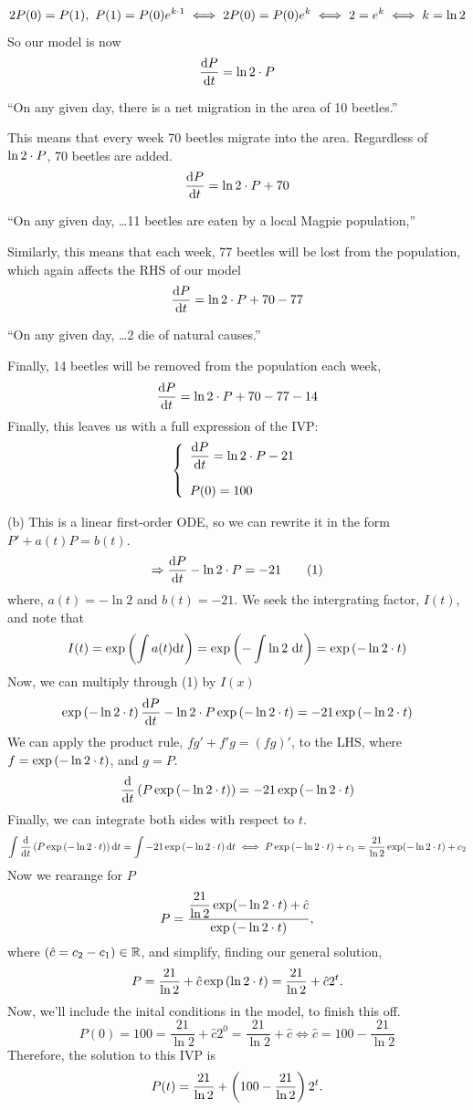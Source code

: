 \documentclass[a4paper, 11pt]{report}
\begin{document}
$$
	2P(0) = P(1),\ P(1) = P(0)e^{k\cd1} \iff 2P(0) = P(0)e^k \iff 2 = e^k \iff k=\ln2
$$
So our model is now
$$
	\dyd[P]{t} = \ln2\cd P
$$
\begin{center}
	``On any given day, there is a net migration in the area of 10 beetles.''
\end{center}
This means that every week 70 beetles migrate into the area. Regardless of $\ln2\cd P$, 70 beetles are added.
$$
	\dyd[P]{t} = \ln2\cd P + 70
$$
\begin{center}
	``On any given day, \dots11 beetles are eaten by a local Magpie population,''
\end{center}
Similarly, this means that each week, 77 beetles will be lost from the population, which again affects the RHS of our model
$$
	\dyd[P]{t} = \ln2\cd P + 70 - 77
$$
\pagebreak
\begin{center}
	``On any given day, \dots2 die of natural causes.''
\end{center}
Finally, 14 beetles will be removed from the population each week,
$$
	\dyd[P]{t} = \ln2\cd P + 70 - 77 - 14
$$
Finally, this leaves us with a full expression of the IVP:
$$
	\left\lbrace \begin{array}{l}
		\dps{\dyd[P]{t} = \ln2\cd P - 21} \\ \\ P(0) = 100
	\end{array} \right.
$$

\sol (b) This is a linear first-order ODE, so we can rewrite it in the form $P' + a(t)P = b(t)$.
\[
	\Rightarrow \dyd[P]{t} - \ln2\cd P = -21 \tag*{(1)}
\]
where, $a(t) = -\ln2$ and $b(t) = -21$. We seek the intergrating factor, $I(t)$, and note that
$$
	I(t) = \exp\bracks{\int a(t)\d t} = \exp\bracks{-\int\ln2\ \d t} = \exp\bracks{-\ln2\cd t}
$$
Now, we can multiply through (1) by $I(x)$
$$
	\exp\bracks{-\ln2\cd t}\dyd[P]{t} - \ln2\cd P\exp\bracks{-\ln2\cd t} = -21\exp\bracks{-\ln2\cd t}
$$
We can apply the product rule, $fg' + f'g = (fg)'$, to the LHS, where $f=\exp\bracks{-\ln2\cd t}$, and $g=P$.
$$
	\dd{t}\bracks{P\exp\bracks{-\ln2\cd t}} = -21\exp\bracks{-\ln2\cd t}
$$
Finally, we can integrate both sides with respect to $t$.
$$
	\int\dd{t}\bracks{P\exp\bracks{-\ln2\cd t}}\d t = \int -21\exp\bracks{-\ln2\cd t}\d t \iff P\exp\bracks{-\ln2\cd t} + c_1 = \frac{21}{\ln2}\exp(-\ln2\cd t) + c_2
$$
Now we rearange for $P$
$$
	P = \frac{\dfrac{21}{\ln2}\exp(-\ln2\cd t) + \hat{c}}{\exp\bracks{-\ln2\cd t}},
$$
where $(\hat{c} = c_2-c_1)\in\bbr$, and simplify, finding our general solution,
$$
	P = \frac{21}{\ln2} + \hat{c}\exp\bracks{\ln2\cd t} = \frac{21}{\ln2}+\hat{c}2^t.
$$
Now, we'll include the inital conditions in the model, to finish this off.
$$
	P(0) = 100 = \frac{21}{\ln2}+\hat{c}2^0 = \frac{21}{\ln2}+\hat{c} \iff \hat{c} = 100 - \frac{21}{\ln2}
$$
Therefore, the solution to this IVP is
$$
	P(t) = \frac{21}{\ln2}+\bracks{100 - \frac{21}{\ln2}}2^t.
$$
\end{document}
